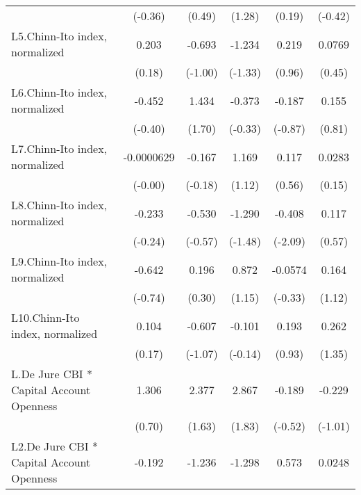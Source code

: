 {\begin{tabular}{l*{5}{c}}
                &  (-0.36)         &   (0.49)         &   (1.28)         &   (0.19)         &  (-0.42)         \\
[1em]
L5.Chinn-Ito index, normalized&    0.203         &   -0.693         &   -1.234         &    0.219         &   0.0769         \\
                &   (0.18)         &  (-1.00)         &  (-1.33)         &   (0.96)         &   (0.45)         \\
[1em]
L6.Chinn-Ito index, normalized&   -0.452         &    1.434         &   -0.373         &   -0.187         &    0.155         \\
                &  (-0.40)         &   (1.70)         &  (-0.33)         &  (-0.87)         &   (0.81)         \\
[1em]
L7.Chinn-Ito index, normalized&-0.0000629         &   -0.167         &    1.169         &    0.117         &   0.0283         \\
                &  (-0.00)         &  (-0.18)         &   (1.12)         &   (0.56)         &   (0.15)         \\
[1em]
L8.Chinn-Ito index, normalized&   -0.233         &   -0.530         &   -1.290         &   -0.408\sym{*}  &    0.117         \\
                &  (-0.24)         &  (-0.57)         &  (-1.48)         &  (-2.09)         &   (0.57)         \\
[1em]
L9.Chinn-Ito index, normalized&   -0.642         &    0.196         &    0.872         &  -0.0574         &    0.164         \\
                &  (-0.74)         &   (0.30)         &   (1.15)         &  (-0.33)         &   (1.12)         \\
[1em]
L10.Chinn-Ito index, normalized&    0.104         &   -0.607         &   -0.101         &    0.193         &    0.262         \\
                &   (0.17)         &  (-1.07)         &  (-0.14)         &   (0.93)         &   (1.35)         \\
[1em]
L.De Jure CBI * Capital Account Openness&    1.306         &    2.377         &    2.867         &   -0.189         &   -0.229         \\
                &   (0.70)         &   (1.63)         &   (1.83)         &  (-0.52)         &  (-1.01)         \\
[1em]
L2.De Jure CBI * Capital Account Openness&   -0.192         &   -1.236         &   -1.298         &    0.573         &   0.0248         \\

\end{tabular}}
